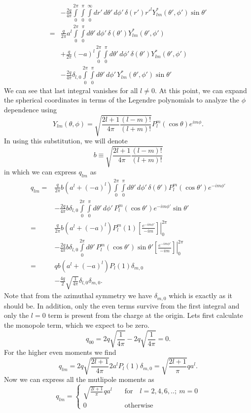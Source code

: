 \documentclass[11pt,letterpaper]{article}
\begin{document}
\begin{enumerate}
\begin{enumerate}[label=\Roman*.]
\begin{align*}
&-\frac{2q}{4\pi}\int\limits_0^{2\pi}\int\limits_0^\pi\int\limits_0^\infty dr'\,d\theta'\,d\phi'\,\delta(r')r'^lY^*_{lm}(\theta',\phi')\sin\theta'\\
=& \frac{q}{2\pi}a^l\int\limits_0^{2\pi}\int\limits_0^\pi d\theta'\,d\phi'\,\delta(\theta')Y^*_{lm}(\theta',\phi')\\
&+ \frac{q}{2\pi}(-a)^l\int\limits_0^{2\pi}\int\limits_0^\pi d\theta'\,d\phi'\,\delta(\theta')Y^*_{lm}(\theta',\phi')\\
&-\frac{2q}{4\pi}\delta_{l,0}\int\limits_0^{2\pi}\int\limits_0^\pi d\theta'\,d\phi'\,Y^*_{lm}(\theta',\phi')\sin\theta'
\end{align*}
We can see that last integral vanishes for all $l\ne0$. At this point, we can expand the spherical coordinates in terms of the Legendre polynomials to analyze the $\phi$ dependence using
$$Y_{lm}(\theta,\phi) = \sqrt{\frac{2l+1}{4\pi}\frac{(l-m)!}{(l+m)!}}P_l^m(\cos\theta)e^{im\phi} .$$
In using this substitution, we will denote
$$b \equiv  \sqrt{\frac{2l+1}{4\pi}\frac{(l-m)!}{(l+m)!}}$$
in which we can express $q_{lm}$ as 
\begin{align*}q_{lm}=&\frac{q}{2\pi}b(a^l+(-a)^l)\int\limits_0^{2\pi}\int\limits_0^\pi d\theta'\,d\phi'\,\delta(\theta')P^m_{l}(\cos\theta')e^{-im\phi'}\\
&-\frac{2q}{4\pi}b\delta_{l,0}\int\limits_0^{2\pi}\int\limits_0^\pi d\theta'\,d\phi'\,P^m_{l}(\cos\theta')e^{-im\phi'}\sin\theta'\\
=&\frac{q}{2\pi}b(a^l+(-a)^l)P_l^m(1)\left.\left[\frac{e^{-im\phi'}}{-im}\right]\right|_0^{2\pi}\\
&-\frac{2q}{4\pi}b\delta_{l,0}\int\limits_0^{2\pi}d\theta'\,P_l^m(\cos\theta')\sin\theta'\left.\left[\frac{e^{-im\phi'}}{-im}\right]\right|_0^{2\pi}\\
=&qb(a^l+(-a)^l)P_l(1)\delta_{m,0}\\
&-\frac{4q}{2}\sqrt{\frac{1}{4\pi}}\delta_{l,0}\delta_{m,0}.
\end{align*}
Note that from the azimuthal symmetry we have $\delta_{m,0}$ which is exactly as it should be. In addition, only the even terms survive from the first integral and only the $l=0$ term is present from the charge at the origin. Lets first calculate the monopole term, which we expect to be zero.
$$q_{00} = 2q\sqrt{\frac{1}{4\pi}}-2q\sqrt{\frac{1}{4\pi}} = 0.$$
For the higher even moments we find 
$$q_{lm} = 2q\sqrt{\frac{2l+1}{4\pi}}2a^lP_l(1)\delta_{m,0}=\sqrt{\frac{2l+1}{\pi}}qa^l.$$
 Now we can express all the mutlipole moments as
$$q_{lm} = \begin{cases}\displaystyle \sqrt{\frac{2l+1}{\pi}}qa^l&\quad\text{for}\quad l =2,4,6,..;\ m=0\\0&\quad\text{otherwise}\end{cases}$$

\end{enumerate}
\end{enumerate}
\end{document}
